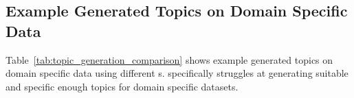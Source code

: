 \subsection{Example Generated Topics on Domain Specific Data}
\label{app:exmaple_generated_topics}
Table~\ref{tab:topic_generation_comparison} shows example generated topics on domain specific data using different \mm{}s. 
%
\topicgpt{} specifically struggles at generating suitable and specific enough topics for domain specific datasets.










